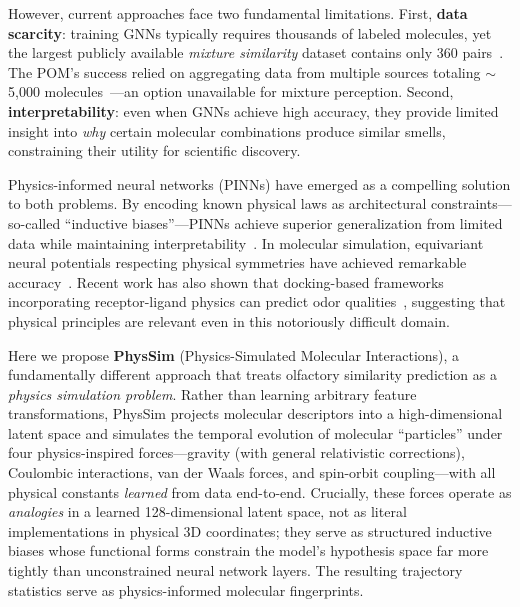 \documentclass[11pt,a4paper]{article}
\begin{document}
However, current approaches face two fundamental limitations. First, \textbf{data scarcity}: training GNNs typically requires thousands of labeled molecules, yet the largest publicly available \emph{mixture similarity} dataset contains only 360 pairs~\cite{snitz2013}. The POM's success relied on aggregating data from multiple sources totaling $\sim$5,000 molecules~\cite{lee2023pom}---an option unavailable for mixture perception. Second, \textbf{interpretability}: even when GNNs achieve high accuracy, they provide limited insight into \emph{why} certain molecular combinations produce similar smells, constraining their utility for scientific discovery.

Physics-informed neural networks (PINNs) have emerged as a compelling solution to both problems. By encoding known physical laws as architectural constraints---so-called ``inductive biases''---PINNs achieve superior generalization from limited data while maintaining interpretability~\cite{raissi2019,karniadakis2021}. In molecular simulation, equivariant neural potentials respecting physical symmetries have achieved remarkable accuracy~\cite{batzner2022,musaelian2023}. Recent work has also shown that docking-based frameworks incorporating receptor-ligand physics can predict odor qualities~\cite{kim2025docking}, suggesting that physical principles are relevant even in this notoriously difficult domain.

Here we propose \textbf{PhysSim} (Physics-Simulated Molecular Interactions), a fundamentally different approach that treats olfactory similarity prediction as a \emph{physics simulation problem}. Rather than learning arbitrary feature transformations, PhysSim projects molecular descriptors into a high-dimensional latent space and simulates the temporal evolution of molecular ``particles'' under four physics-inspired forces---gravity (with general relativistic corrections), Coulombic interactions, van der Waals forces, and spin-orbit coupling---with all physical constants \emph{learned} from data end-to-end. Crucially, these forces operate as \emph{analogies} in a learned 128-dimensional latent space, not as literal implementations in physical 3D coordinates; they serve as structured inductive biases whose functional forms constrain the model's hypothesis space far more tightly than unconstrained neural network layers. The resulting trajectory statistics serve as physics-informed molecular fingerprints.
\end{document}
